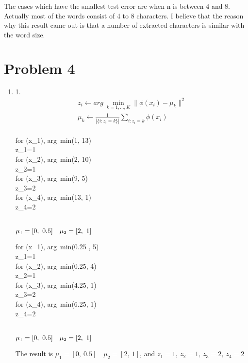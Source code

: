 \documentclass[12pt]{article}
\begin{document}
\begin{enumerate}[label=(\alph*)]
  The cases which have the smallest test error are when n is between 4 and 8.
  Actually most of the words consist of 4 to 8 characters.
  I believe that the reason why this result came out is that a number of extracted characters is similar with the word size.


\end{enumerate}
\section*{Problem 4}
\begin{enumerate}[label=(\alph*)]
\item
1. \\
\begin{align*}
  z_i \leftarrow arg \ \min_{k=1,...,K}\parallel\phi(x_i)-\mu_k\parallel^2\\
  \mu_k\leftarrow \frac{1}{|\{ i: z_i = k\}|}\sum_{i:z_i=k} \phi(x_i)\\
\end{align*}

\begin{center}
  for \phi(x_1), arg\ min(1, 13)\\
  z_1=1\\
  for \phi(x_2), arg\ min(2, 10)\\
  z_2=1\\
  for \phi(x_3), arg\ min(9, 5)\\
  z_3=2\\
  for \phi(x_4), arg\ min(13, 1)\\
  z_4=2\\\\
\end{center}
\begin{center}
  $\mu_1=[0, \ 0.5] \quad \mu_2=[2, \ 1]\\\\$
\end{center}

\begin{center}
  for \phi(x_1), arg\ min(0.25 , 5)\\
  z_1=1\\
  for \phi(x_2), arg\ min(0.25, 4)\\
  z_2=1\\
  for \phi(x_3), arg\ min(4.25, 1)\\
  z_3=2\\
  for \phi(x_4), arg\ min(6.25, 1)\\
  z_4=2\\\\
\end{center}
\begin{center}
  $\mu_1=[0, \ 0.5] \quad \mu_2=[2, \ 1]\\\\$
\end{center}
The result is $\mu_1=[0, \ 0.5] \quad \mu_2=[2, \ 1]$, and $z_1=1,\ z_2=1,\ z_3=2,\ z_4=2$\\\\


\end{enumerate}
\end{document}
